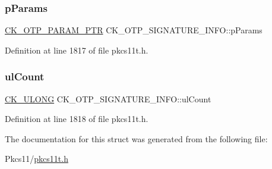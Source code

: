 \subsubsection{\texorpdfstring{p\+Params}{pParams}}
{\footnotesize\ttfamily \hyperlink{pkcs11t_8h_a520ae5ec458e07a78dd1f869974e6b98}{C\+K\+\_\+\+O\+T\+P\+\_\+\+P\+A\+R\+A\+M\+\_\+\+P\+TR} C\+K\+\_\+\+O\+T\+P\+\_\+\+S\+I\+G\+N\+A\+T\+U\+R\+E\+\_\+\+I\+N\+F\+O\+::p\+Params}



Definition at line 1817 of file pkcs11t.\+h.

\mbox{\label{struct_c_k___o_t_p___s_i_g_n_a_t_u_r_e___i_n_f_o_a5b747d449bdffb39163d0d143d50711b}} 
\subsubsection{\texorpdfstring{ul\+Count}{ulCount}}
{\footnotesize\ttfamily \hyperlink{pkcs11t_8h_a35181858a3b7a0a81f49d180d8f446ef}{C\+K\+\_\+\+U\+L\+O\+NG} C\+K\+\_\+\+O\+T\+P\+\_\+\+S\+I\+G\+N\+A\+T\+U\+R\+E\+\_\+\+I\+N\+F\+O\+::ul\+Count}



Definition at line 1818 of file pkcs11t.\+h.



The documentation for this struct was generated from the following file\+:\begin{DoxyCompactItemize}
\item 
Pkcs11/\hyperlink{pkcs11t_8h}{pkcs11t.\+h}\end{DoxyCompactItemize}
